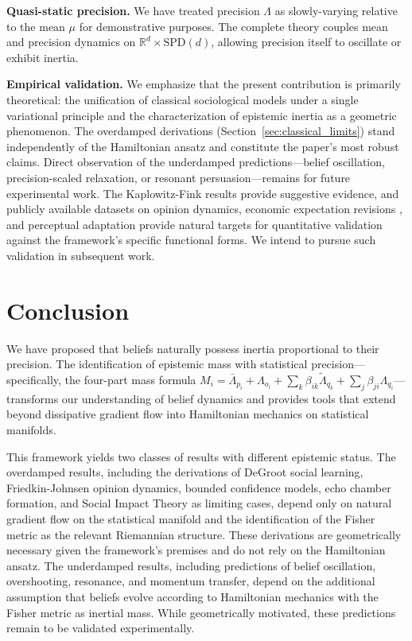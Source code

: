\documentclass[12pt]{article}
\begin{document}
\textbf{Quasi-static precision.} We have treated precision $\Lambda$ as slowly-varying relative to the mean $\mu$ for demonstrative purposes. The complete theory couples mean and precision dynamics on $\mathbb{R}^d \times \mathrm{SPD}(d)$, allowing precision itself to oscillate or exhibit inertia.

\textbf{Empirical validation.} We emphasize that the present contribution is primarily theoretical: the unification of classical sociological models under a single variational principle and the characterization of epistemic inertia as a geometric phenomenon. The overdamped derivations (Section~\ref{sec:classical_limits}) stand independently of the Hamiltonian ansatz and constitute the paper's most robust claims. Direct observation of the underdamped predictions---belief oscillation, precision-scaled relaxation, or resonant persuasion---remains for future experimental work. The Kaplowitz-Fink results \citep{kaplowitz1983, fink2002} provide suggestive evidence, and publicly available datasets on opinion dynamics, economic expectation revisions \citep{coibion2015}, and perceptual adaptation provide natural targets for quantitative validation against the framework's specific functional forms. We intend to pursue such validation in subsequent work.



\section{Conclusion}

We have proposed that beliefs naturally possess inertia proportional to their precision. The identification of epistemic mass with statistical precision---specifically, the four-part mass formula $M_i = \bar{\Lambda}_{p_i} + \Lambda_{o_i} + \sum_k \beta_{ik}\tilde{\Lambda}_{q_k} + \sum_j \beta_{ji}\Lambda_{q_i}$---transforms our understanding of belief dynamics and provides tools that extend beyond dissipative gradient flow into Hamiltonian mechanics on statistical manifolds.

This framework yields two classes of results with different epistemic status. The overdamped results, including the derivations of DeGroot social learning, Friedkin-Johnsen opinion dynamics, bounded confidence models, echo chamber formation, and Social Impact Theory as limiting cases, depend only on natural gradient flow on the statistical manifold and the identification of the Fisher metric as the relevant Riemannian structure. These derivations are geometrically necessary given the framework's premises and do not rely on the Hamiltonian ansatz. The underdamped results, including predictions of belief oscillation, overshooting, resonance, and momentum transfer, depend on the additional assumption that beliefs evolve according to Hamiltonian mechanics with the Fisher metric as inertial mass. While geometrically motivated, these predictions remain to be validated experimentally.
\end{document}
